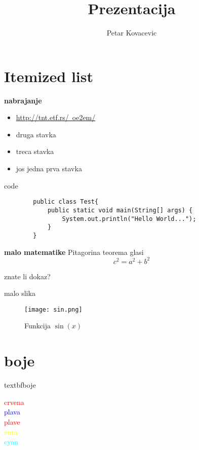\documentclass{beamer}
\title[prezentacija]{\Huge{Prezentacija}} %
\author{Petar Kovacevic}
\begin{document}
\begin{frame}
	\titlepage
\end{frame}

\section{Itemized list}
\begin{frame}{\textbf{nabrajanje}}
	\begin{itemize}
		\item  \href{http://tnt.etf.rs/~oe2em/}{http://tnt.etf.rs/~oe2em/}
		\item  druga stavka
		\item  treca stavka
		\item  jos jedna prva stavka
	\end{itemize}
\end{frame}

\begin{frame}[fragile]{code}
	\begin{verbatim}	
		public class Test{
			public static void main(String[] args) {
				System.out.println("Hello World...");
			}
		}
	\end{verbatim}
\end{frame}

\begin{frame}{\textbf{malo matematike}}
	Pitagorina teorema glasi
	\pause
	\bigskip
	\begin{equation}	
		c^2 = a^2 + b^2
	\end{equation}
	\pause

	znate li dokaz?
\end{frame}

\begin{frame}{malo slika}
	\begin{figure}
		\centering
		\texttt{[image: sin.png]}
		\caption{Funkcija $\sin \left( x \right)$}
		\label{slika:sinus}
	\end{figure}
\end{frame}

\section{boje}
\begin{frame}{textbf{boje}}
	\begin{Large}
	\textcolor{red}{crvena}\\
	\textcolor{blue}{plava}\\
	\textcolor{red}{plave}\\
	\textcolor{yellow}{zuta}\\
	\textcolor{cyan}{cyan}\\
	\end{Large}
\end{frame}
\end{document}
